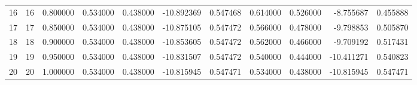 \begin{tabular}{lrrrrrrrrrr}
16 & 16 & 0.800000 & 0.534000 & 0.438000 & -10.892369 & 0.547468 & 0.614000 & 0.526000 & -8.755687 & 0.455888 \\
17 & 17 & 0.850000 & 0.534000 & 0.438000 & -10.875105 & 0.547472 & 0.566000 & 0.478000 & -9.798853 & 0.505870 \\
18 & 18 & 0.900000 & 0.534000 & 0.438000 & -10.853605 & 0.547472 & 0.562000 & 0.466000 & -9.709192 & 0.517431 \\
19 & 19 & 0.950000 & 0.534000 & 0.438000 & -10.831507 & 0.547472 & 0.540000 & 0.444000 & -10.411271 & 0.540823 \\
20 & 20 & 1.000000 & 0.534000 & 0.438000 & -10.815945 & 0.547471 & 0.534000 & 0.438000 & -10.815945 & 0.547471 \\
\bottomrule
\end{tabular}
